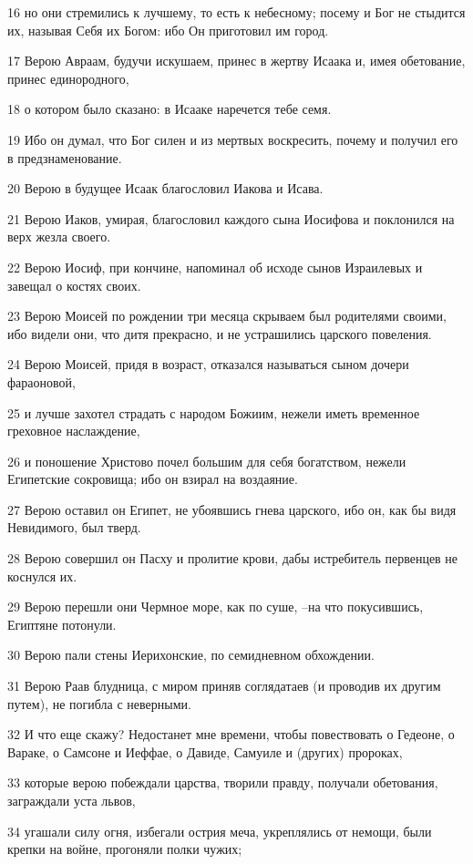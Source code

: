 \par 16 но они стремились к лучшему, то есть к небесному; посему и Бог не стыдится их, называя Себя их Богом: ибо Он приготовил им город.
\par 17 Верою Авраам, будучи искушаем, принес в жертву Исаака и, имея обетование, принес единородного,
\par 18 о котором было сказано: в Исааке наречется тебе семя.
\par 19 Ибо он думал, что Бог силен и из мертвых воскресить, почему и получил его в предзнаменование.
\par 20 Верою в будущее Исаак благословил Иакова и Исава.
\par 21 Верою Иаков, умирая, благословил каждого сына Иосифова и поклонился на верх жезла своего.
\par 22 Верою Иосиф, при кончине, напоминал об исходе сынов Израилевых и завещал о костях своих.
\par 23 Верою Моисей по рождении три месяца скрываем был родителями своими, ибо видели они, что дитя прекрасно, и не устрашились царского повеления.
\par 24 Верою Моисей, придя в возраст, отказался называться сыном дочери фараоновой,
\par 25 и лучше захотел страдать с народом Божиим, нежели иметь временное греховное наслаждение,
\par 26 и поношение Христово почел большим для себя богатством, нежели Египетские сокровища; ибо он взирал на воздаяние.
\par 27 Верою оставил он Египет, не убоявшись гнева царского, ибо он, как бы видя Невидимого, был тверд.
\par 28 Верою совершил он Пасху и пролитие крови, дабы истребитель первенцев не коснулся их.
\par 29 Верою перешли они Чермное море, как по суше, --на что покусившись, Египтяне потонули.
\par 30 Верою пали стены Иерихонские, по семидневном обхождении.
\par 31 Верою Раав блудница, с миром приняв соглядатаев (и проводив их другим путем), не погибла с неверными.
\par 32 И что еще скажу? Недостанет мне времени, чтобы повествовать о Гедеоне, о Вараке, о Самсоне и Иеффае, о Давиде, Самуиле и (других) пророках,
\par 33 которые верою побеждали царства, творили правду, получали обетования, заграждали уста львов,
\par 34 угашали силу огня, избегали острия меча, укреплялись от немощи, были крепки на войне, прогоняли полки чужих;
